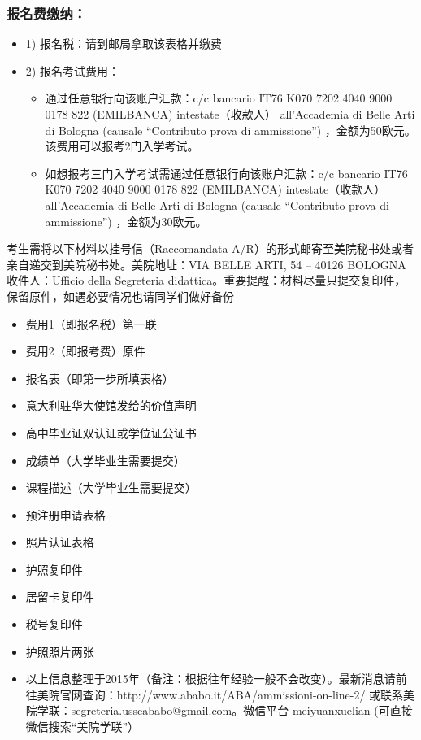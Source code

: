 \subsubsection{报名费缴纳：}
\begin{itemize}
\item 1) 报名税：请到邮局拿取该表格并缴费
\item 2) 报名考试费用：
          \begin{itemize}
                  \item 通过任意银行向该账户汇款：c/c bancario IT76 K070 7202 4040 9000 0178 822 (EMILBANCA)  intestate（收款人） all’Accademia di Belle Arti di Bologna (causale “Contributo prova di ammissione”) ，金额为50欧元。该费用可以报考2门入学考试。
                  \item  如想报考三门入学考试需通过任意银行向该账户汇款：c/c bancario IT76 K070 7202 4040 9000 0178 822 (EMILBANCA)  intestate（收款人） all’Accademia di Belle Arti di Bologna (causale “Contributo prova di ammissione”) ，金额为30欧元。
          \end{itemize}
\end{itemize}

考生需将以下材料以挂号信（Raccomandata A/R）的形式邮寄至美院秘书处或者亲自递交到美院秘书处。美院地址：VIA BELLE ARTI, 54 – 40126 BOLOGNA 收件人：Ufficio della Segreteria didattica。重要提醒：材料尽量只提交复印件，保留原件，如遇必要情况也请同学们做好备份
\begin{itemize}
    \item  费用1（即报名税）第一联
    \item  费用2（即报考费）原件
    \item  报名表（即第一步所填表格）
    \item  意大利驻华大使馆发给的价值声明
    \item  高中毕业证双认证或学位证公证书
    \item  成绩单（大学毕业生需要提交）
    \item  课程描述（大学毕业生需要提交）
    \item  预注册申请表格
    \item  照片认证表格
    \item  护照复印件
    \item  居留卡复印件
    \item  税号复印件
    \item  护照照片两张
    \item  以上信息整理于2015年（备注：根据往年经验一般不会改变）。最新消息请前往美院官网查询：http://www.ababo.it/ABA/ammissioni-on-line-2/ 或联系美院学联：segreteria.usscababo@gmail.com。微信平台  meiyuanxuelian (可直接微信搜索“美院学联”）
\end{itemize}

